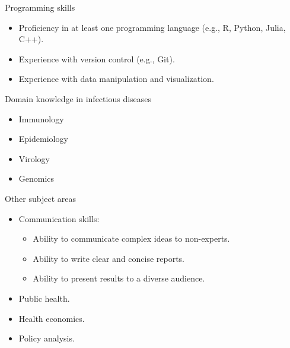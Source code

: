\documentclass[
  ignorenonframetext,
]{beamer}
\providecommand{\tightlist}{%
  \setlength{\itemsep}{0pt}\setlength{\parskip}{0pt}}\usepackage{longtable,booktabs,array}
\begin{document}
\begin{frame}
\begin{block}{Programming skills}
\label{programming-skills}
\begin{itemize}
\tightlist
\item
  Proficiency in at least one programming language (e.g., R, Python,
  Julia, C++).
\item
  Experience with version control (e.g., Git).
\item
  Experience with data manipulation and visualization.
\end{itemize}
\end{block}
\end{frame}

\begin{frame}
\begin{block}{Domain knowledge in infectious diseases}
\label{domain-knowledge-in-infectious-diseases}
\begin{itemize}
\tightlist
\item
  Immunology
\item
  Epidemiology
\item
  Virology
\item
  Genomics
\end{itemize}
\end{block}
\end{frame}

\begin{frame}
\begin{block}{Other subject areas}
\label{other-subject-areas}
\begin{itemize}
\tightlist
\item
  Communication skills:

  \begin{itemize}
  \tightlist
  \item
    Ability to communicate complex ideas to non-experts.
  \item
    Ability to write clear and concise reports.
  \item
    Ability to present results to a diverse audience.
  \end{itemize}
\item
  Public health.
\item
  Health economics.
\item
  Policy analysis.
\end{itemize}
\end{block}
\end{frame}
\end{document}
